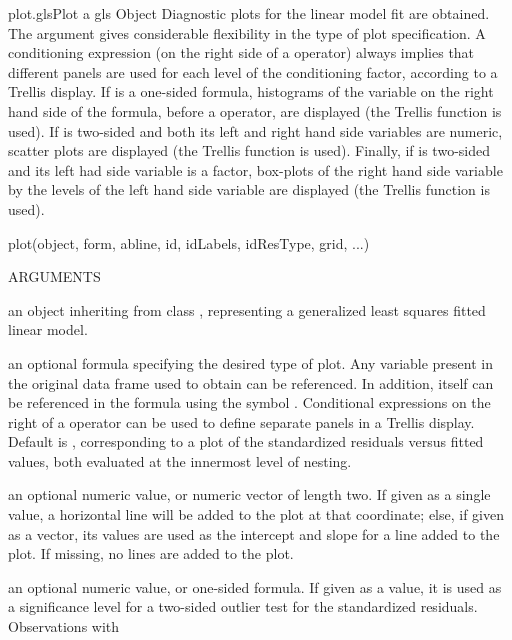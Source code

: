\documentclass[pdftex]{article} \usepackage{url,graphicx}
\renewcommand{\Twiddle}{\mbox{\(\sim\)}}
\begin{document}
\begin{Helpfile}{plot.gls}{Plot a gls Object}
Diagnostic plots for the linear model fit are obtained. The
 argument gives considerable flexibility in the type of
plot specification. A conditioning expression (on the right side of a
\Co{|} operator) always implies that different panels are used for
each level of the conditioning factor, according to a Trellis
display. If  is a one-sided formula, histograms of the
variable on the right hand side of the formula, before a \Co{|}
operator, are displayed (the Trellis function  is
used). If  is two-sided and both its left and
right hand side variables are numeric, scatter plots are displayed
(the Trellis function  is used). Finally, if 
is two-sided and its left had side variable is a factor, box-plots of
the right hand side variable by the levels of the left hand side
variable are displayed (the Trellis function   is used).
\begin{Example}
plot(object, form, abline, id, idLabels, idResType, grid, ...)
\end{Example}
\begin{Argument}{ARGUMENTS}
\item[\Co{object:}]
an object inheriting from class , representing
a generalized least squares fitted linear model.
\item[\Co{form:}]
an optional formula specifying the desired type of
plot. Any variable present in the original data frame used to obtain
 can be referenced. In addition,  itself
can be referenced in the formula using the symbol
. Conditional expressions on the right of a \Co{|}
operator can be used to define separate panels in a Trellis
display. Default is \Co{resid(., type = "p") \Twiddle fitted(.)},
corresponding to a plot of the standardized residuals versus fitted
values, both evaluated at the innermost level of nesting.
\item[\Co{abline:}]
an optional numeric value, or numeric vector of length
two. If given as a single value, a horizontal line will be added to the
plot at that coordinate; else, if given as a vector, its values are
used as the intercept and slope for a line added to the plot. If
missing, no lines are added to the plot.
\item[\Co{id:}]
an optional numeric value, or one-sided formula. If given as
a value, it is used as a significance level for a two-sided outlier
test for the standardized residuals. Observations with

\end{Argument}
\end{Helpfile}
\end{document}

